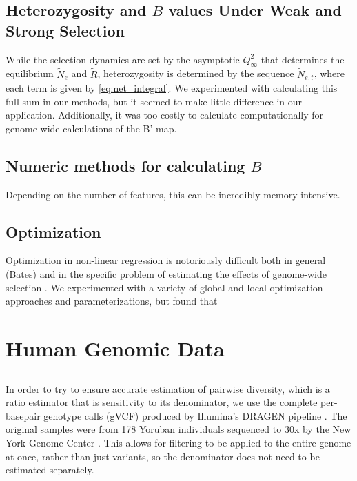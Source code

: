 \documentclass[11pt]{article}
\begin{document}


\subsection{Heterozygosity and $B$ values Under Weak and Strong Selection}

While the selection dynamics are set by the asymptotic $Q_\infty^2$ that
determines the equilibrium $\widetilde{N}_e$ and $\widetilde{R}$,
heterozygosity is determined by the sequence $\widetilde{N}_{e,t}$, where each
term is given by \eqref{eq:net_integral}. We experimented with calculating this
full sum in our methods, but it seemed to make little difference in our
application. Additionally, it was too costly to calculate computationally
for genome-wide calculations of the B' map.


\subsection{Numeric methods for calculating $B$}

Depending on the number of features, this can be incredibly memory intensive.

\subsection{Optimization}

Optimization in non-linear regression is notoriously difficult both in general
(Bates) and in the specific problem of estimating the effects of genome-wide
selection \parencite{Murphy2022-sj}. We experimented with a variety of global
and local optimization approaches and parameterizations, but found that 


\section{Human Genomic Data}


\subsection{}

In order to try to ensure accurate estimation of pairwise diversity, which is a
ratio estimator that is sensitivity to its denominator, we use the complete
per-basepair genotype calls (gVCF) produced by Illumina's DRAGEN pipeline
\parencite{Illumina_Inc2020-dk}. The original samples were from 178 Yoruban
individuals sequenced to 30x by the New York Genome Center
\parencite{Byrska-Bishop2022-tn}. This allows for filtering to be applied to
the entire genome at once, rather than just variants, so the denominator does
not need to be estimated separately.
\end{document}
